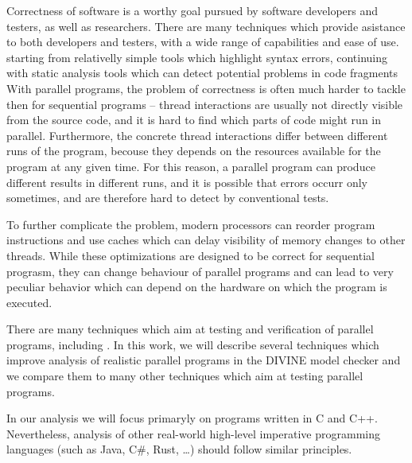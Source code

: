 Correctness of software is a worthy goal pursued by software developers and testers, as well as researchers.
There are many techniques which provide asistance to both developers and testers, with a wide range of capabilities and ease of use.
starting from relativelly simple tools which highlight syntax errors, continuing with static analysis tools which can detect potential problems in code fragments
With parallel programs, the problem of correctness is often much harder to tackle then for sequential programs -- thread interactions are usually not directly visible from the source code, and it is hard to find which parts of code might run in parallel.
Furthermore, the concrete thread interactions differ between different runs of the program, becouse they depends on the resources available for the program at any given time.
For this reason, a parallel program can produce different results in different runs, and it is possible that errors occurr only sometimes, and are therefore hard to detect by conventional tests.

To further complicate the problem, modern processors can reorder program instructions and use caches which can delay visibility of memory changes to other threads.
While these optimizations are designed to be correct for sequential prograsm, they can change behaviour of parallel programs and can lead to very peculiar behavior which can depend on the hardware on which the program is executed.

There are many techniques which aim at testing and verification of parallel programs, including .
In this work, we will describe several techniques which improve analysis of realistic parallel programs in the DIVINE model checker and we compare them to many other techniques which aim at testing parallel programs.

In our analysis we will focus primaryly on programs written in C and C++.
Nevertheless, analysis of other real-world high-level imperative programming languages (such as Java, C\#, Rust, …) should follow similar principles.

